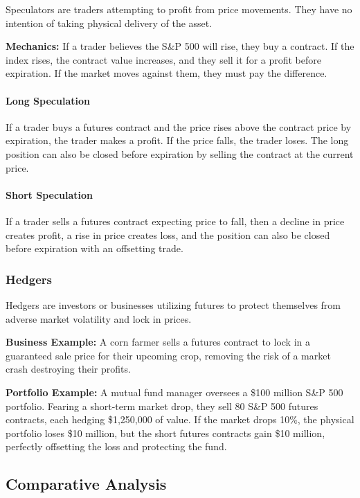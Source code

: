 \documentclass[12pt,openany]{book}
\begin{document}
Speculators are traders attempting to profit from price movements. They have no intention of taking physical delivery of the asset.

\textbf{Mechanics:} If a trader believes the S\&P 500 will rise, they buy a contract. If the index rises, the contract value increases, and they sell it for a profit before expiration. If the market moves against them, they must pay the difference.

\paragraph{Long Speculation}

If a trader buys a futures contract and the price rises above the contract price by expiration, the trader makes a profit. If the price falls, the trader loses. The long position can also be closed before expiration by selling the contract at the current price.

\paragraph{Short Speculation}

If a trader sells a futures contract expecting price to fall, then a decline in price creates profit, a rise in price creates loss, and the position can also be closed before expiration with an offsetting trade.

\subsubsection{Hedgers}

Hedgers are investors or businesses utilizing futures to protect themselves from adverse market volatility and lock in prices.

\textbf{Business Example:} A corn farmer sells a futures contract to lock in a guaranteed sale price for their upcoming crop, removing the risk of a market crash destroying their profits.

\textbf{Portfolio Example:} A mutual fund manager oversees a \$100 million S\&P 500 portfolio. Fearing a short-term market drop, they sell 80 S\&P 500 futures contracts, each hedging \$1,250,000 of value. If the market drops 10\%, the physical portfolio loses \$10 million, but the short futures contracts gain \$10 million, perfectly offsetting the loss and protecting the fund.

\subsection{Comparative Analysis}
\end{document}
